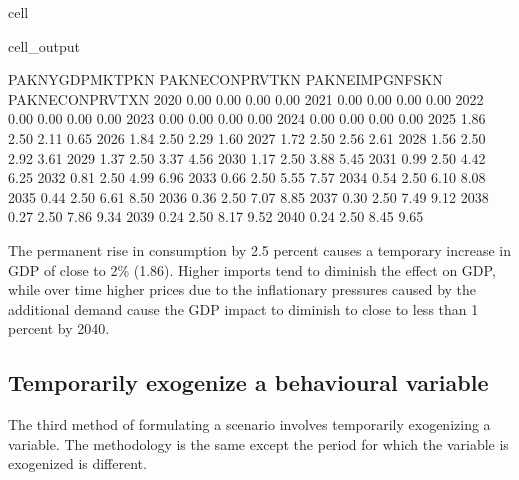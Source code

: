 \documentclass[letterpaper,10pt,english]{jupyterBook}
\begin{document}
\begin{sphinxuseclass}{cell}
\begin{sphinxVerbatimOutput}
\begin{sphinxuseclass}{cell_output}
\begin{sphinxVerbatim}[commandchars=\\\{\}]
      PAKNYGDPMKTPKN  PAKNECONPRVTKN  PAKNEIMPGNFSKN  PAKNECONPRVTXN
2020            0.00            0.00            0.00            0.00
2021           \PYGZhy{}0.00            0.00           \PYGZhy{}0.00            0.00
2022           \PYGZhy{}0.00            0.00            0.00            0.00
2023            0.00            0.00            0.00            0.00
2024           \PYGZhy{}0.00            0.00            0.00            0.00
2025            1.86            2.50            2.11            0.65
2026            1.84            2.50            2.29            1.60
2027            1.72            2.50            2.56            2.61
2028            1.56            2.50            2.92            3.61
2029            1.37            2.50            3.37            4.56
2030            1.17            2.50            3.88            5.45
2031            0.99            2.50            4.42            6.25
2032            0.81            2.50            4.99            6.96
2033            0.66            2.50            5.55            7.57
2034            0.54            2.50            6.10            8.08
2035            0.44            2.50            6.61            8.50
2036            0.36            2.50            7.07            8.85
2037            0.30            2.50            7.49            9.12
2038            0.27            2.50            7.86            9.34
2039            0.24            2.50            8.17            9.52
2040            0.24            2.50            8.45            9.65
\end{sphinxVerbatim}

\end{sphinxuseclass}\end{sphinxVerbatimOutput}

\end{sphinxuseclass}
\sphinxAtStartPar
The permanent rise in consumption by 2.5 percent causes a temporary increase in GDP of close to 2\% (1.86). Higher imports tend to diminish the effect on GDP, while over time higher prices due to the inflationary pressures caused by the additional demand cause the GDP impact to diminish to close to less than 1 percent by 2040.


\subsection{Temporarily exogenize a behavioural variable}
\label{\detokenize{content/06_WBModels/ScenarioAnalysis:temporarily-exogenize-a-behavioural-variable}}
\sphinxAtStartPar
The third method of formulating a scenario involves temporarily exogenizing a variable.    The methodology is the same except the period for which the variable is exogenized is different.
\end{document}
